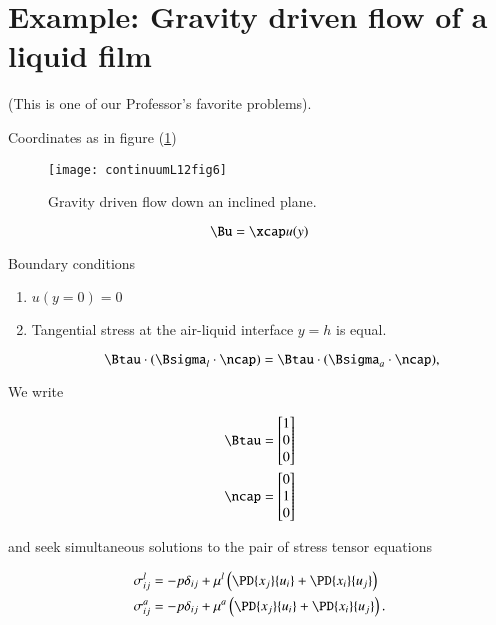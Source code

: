 \section{Example: Gravity driven flow of a liquid film}

(This is one of our Professor's favorite problems).

Coordinates as in figure (\ref{fig:continuumL12:continuumL12fig6})
\begin{figure}[htp]
   \centering
   \texttt{[image: continuumL12fig6]}
   \caption{Gravity driven flow down an inclined plane.}\label{fig:continuumL12:continuumL12fig6}
\end{figure}

\begin{equation}\label{eqn:continuumL12:150}
\Bu = \xcap u(y)
\end{equation}

Boundary conditions

\begin{enumerate}
\item $u(y = 0) = 0$
\item Tangential stress at the air-liquid interface $y = h$ is equal.

\begin{equation}\label{eqn:continuumL12:170}
\Btau \cdot (\Bsigma_l \cdot \ncap) = \Btau \cdot (\Bsigma_a \cdot \ncap),
\end{equation}
\end{enumerate}

We write 

\begin{align}\label{eqn:continuumL12:190}
\Btau &= 
\begin{bmatrix}
1 \\
0 \\
0
\end{bmatrix} \\
\ncap &= 
\begin{bmatrix}
0 \\
1 \\
0
\end{bmatrix} \\
\end{align}

and seek simultaneous solutions to the pair of stress tensor equations

\begin{align}\label{eqn:continuumL12:210}
\sigma_{ij}^l 
&= - p \delta_{ij} + \mu^l \left( 
\PD{x_j}{u_i} +
\PD{x_i}{u_j}
\right) \\
\sigma_{ij}^a 
&= - p \delta_{ij} + \mu^a \left( 
\PD{x_j}{u_i} +
\PD{x_i}{u_j}
\right).
\end{align}

